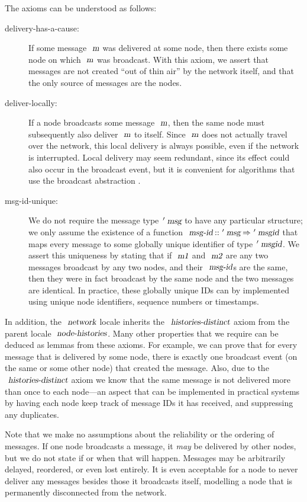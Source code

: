 The axioms can be understood as follows:
\begin{description}
    \item[delivery-has-a-cause:] If some message $\isa{m}$ was delivered at some node, then there exists some node on which $\isa{m}$ was broadcast.
        With this axiom, we assert that messages are not created ``out of thin air'' by the network itself, and that the only source of messages are the nodes.
    \item[deliver-locally:] If a node broadcasts some message $\isa{m}$, then the same node must subsequently also deliver $\isa{m}$ to itself.
        Since $\isa{m}$ does not actually travel over the network, this local delivery is always possible, even if the network is interrupted.
        Local delivery may seem redundant, since its effect could also occur in the broadcast event, but it is convenient for algorithms that use the broadcast abstraction \cite{Cachin:2011wt}.
    \item[msg-id-unique:] We do not require the message type $\isacharprime\isa{msg}$ to have any particular structure; we only assume the existence of a function $\isa{msg-id} \mathbin{\isacharcolon\isacharcolon} \isacharprime\isa{msg} \mathbin{\isasymRightarrow} \isacharprime\isa{msgid}$ that maps every message to some globally unique identifier of type $\isacharprime\isa{msgid}$.
        We assert this uniqueness by stating that if $\isa{m1}$ and $\isa{m2}$ are any two messages broadcast by any two nodes, and their $\isa{msg-id}$s are the same, then they were in fact broadcast by the same node and the two messages are identical. 
        In practice, these globally unique IDs can by implemented using unique node identifiers, sequence numbers or timestamps.
\end{description}

In addition, the $\isa{network}$ locale inherits the $\isa{histories-distinct}$ axiom from the parent locale $\isa{node-histories}$.
Many other properties that we require can be deduced as lemmas from these axioms.
For example, we can prove that for every message that is delivered by some node, there is exactly one broadcast event (on the same or some other node) that created the message.
Also, due to the $\isa{histories-distinct}$ axiom we know that the same message is not delivered more than once to each node---an aspect that can be implemented in practical systems by having each node keep track of message IDs it has received, and suppressing any duplicates.

Note that we make no assumptions about the reliability or the ordering of messages.
If one node broadcasts a message, it \emph{may} be delivered by other nodes, but we do not state if or when that will happen.
Messages may be arbitrarily delayed, reordered, or even lost entirely.
It is even acceptable for a node to never deliver any messages besides those it broadcasts itself, modelling a node that is permanently disconnected from the network.

